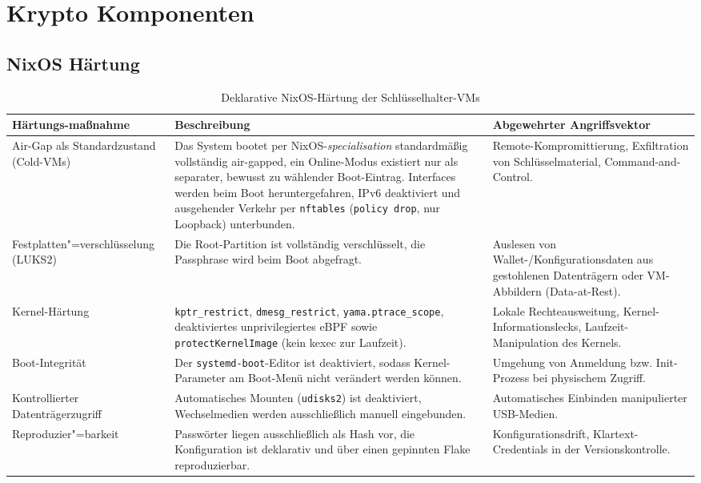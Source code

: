 \section{Krypto Komponenten}

\subsection{NixOS Härtung}

\begin{table}[H]
\centering
\footnotesize
\setlength{\tabcolsep}{4pt}
\renewcommand{\arraystretch}{1.2}
\begin{tabularx}{\linewidth}{@{} >{\RaggedRight}p{2.6cm} >{\RaggedRight}X >{\RaggedRight}X @{}}
\toprule
\textbf{Härtungs-}\newline \textbf{maßnahme} & \textbf{Beschreibung} & \textbf{Abgewehrter Angriffsvektor} \\
\midrule
Air-Gap als Standardzustand (Cold-\acp{VM})
  & Das System bootet per NixOS-\emph{specialisation} standardmäßig vollständig air-gapped, ein Online-Modus existiert nur als separater, bewusst zu wählender Boot-Eintrag. Interfaces werden beim Boot heruntergefahren, IPv6 deaktiviert und ausgehender Verkehr per \texttt{nftables} (\texttt{policy drop}, nur Loopback) unterbunden.
  & Remote-Kompromittierung, Exfiltration von Schlüsselmaterial, Command-and-Control. \\
\addlinespace
Festplatten"=verschlüsselung (\acs{LUKS}2)
  & Die Root-Partition ist vollständig verschlüsselt, die Passphrase wird beim Boot abgefragt.
  & Auslesen von Wallet-/Konfigurationsdaten aus gestohlenen Datenträgern oder \ac{VM}-Abbildern (Data-at-Rest). \\
\addlinespace
Kernel-Härtung
  & \texttt{kptr\_restrict}, \texttt{dmesg\_restrict}, \texttt{yama.ptrace\_scope}, deaktiviertes unprivilegiertes \acs{eBPF} sowie \texttt{protectKernelImage} (kein kexec zur Laufzeit).
  & Lokale Rechteausweitung, Kernel-Informationslecks, Laufzeit-Manipulation des Kernels. \\
\addlinespace
Boot-Integrität
  & Der \texttt{systemd-boot}-Editor ist deaktiviert, sodass Kernel-Parameter am Boot-Menü nicht verändert werden können.
  & Umgehung von Anmeldung bzw. Init-Prozess bei physischem Zugriff. \\
\addlinespace
Kontrollierter Datenträgerzugriff
  & Automatisches Mounten (\texttt{udisks2}) ist deaktiviert, Wechselmedien werden ausschließlich manuell eingebunden.
  & Automatisches Einbinden manipulierter \ac{USB}-Medien. \\
\addlinespace
Reproduzier"=barkeit
  & Passwörter liegen ausschließlich als Hash vor, die Konfiguration ist deklarativ und über einen gepinnten Flake reproduzierbar.
  & Konfigurationsdrift, Klartext-Credentials in der Versionskontrolle. \\
\bottomrule
\end{tabularx}
\caption{Deklarative NixOS-Härtung der Schlüsselhalter-\acs{VM}s}
\label{tab:nixos_hardening}
\end{table}


